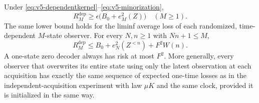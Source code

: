 \begin{theorem}\label{thm:v5-dependent}
Under \eqref{eq:v5-dependentkernel}--\eqref{eq:v5-minorization},
\begin{equation}\label{eq:v5-dependentlower}
 R_M^{\mathrm{dep}}\ge\epsilon\bigl(B_0+e_M^2(Z)\bigr)
 \quad(M\ge1).
\end{equation}
The same lower bound holds for the liminf average loss of each
randomized, time-dependent $M$-state observer. For every $N,n\ge1$
with $Nn+1\le M$,
\begin{equation}\label{eq:v5-dependentupper}
 R_M^{\mathrm{dep}}\le B_0+e_N^2(Z^{<n})+F^2W(n).
\end{equation}
A one-state zero decoder always has risk at most $F^2$.
More generally, every observer that overwrites its entire state
using only the latest observation at each acquisition has exactly
the same sequence of expected one-time losses as in the
independent-acquisition experiment with law $\mu K$ and the same
clock, provided it is initialized in the same way.
\end{theorem}

